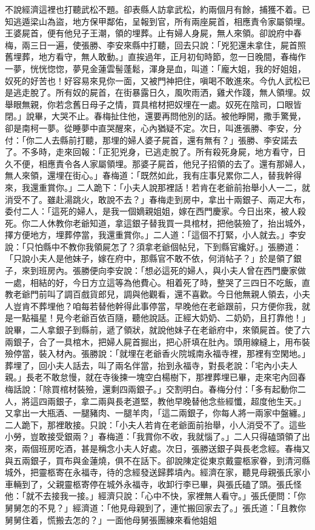 不說經濟這裡也打聽武松不題。卻表縣人訪拿武松，約兩個月有餘，捕獲不着。已知逃遁梁山為盜，地方保甲鄰佑，呈報到官，所有兩座屍首，相應責令家屬領埋。王婆屍首，便有他兒子王潮，領的埋葬。止有婦人身屍，無人來領。卻說府中春梅，兩三日一遍，使張勝、李安來縣中打聽，回去只說：「兇犯還未拿住，屍首照舊埋葬，地方看守，無人敢動。」直挨過年，正月初旬時節，忽一日晚間，春梅作一夢，恍恍惚惚，夢見金蓮雲髻蓬鬆，渾身是血，叫道：「龐大姐，我的好姐姐，奴死的好苦也！好容易來見你一面，又被門神把住，嗔喝不敢進來。今仇人武松已是逃走脫了。所有奴的屍首，在街暴露日久，風吹雨洒，雞犬作踐，無人領埋。奴舉眼無親，你若念舊日母子之情，買具棺材把奴埋在一處。奴死在陰司，口眼皆閉。」說畢，大哭不止。春梅扯住他，還要再問他別的話。被他睜開，撒手驚覺，卻是南柯一夢。從睡夢中直哭醒來，心內猶疑不定。次日，叫進張勝、李安，分付：「你二人去縣前打聽，那埋的婦人婆子屍首，還有無有？」張勝、李安諾去了。不多時，走來回報：「正犯兇身，已逃走脫了。所有殺死身屍，地方看守，日久不便，相應責令各人家屬領埋。那婆子屍首，他兒子招領的去了。還有那婦人，無人來領，還埋在街心。」春梅道：「既然如此，我有庄事兒累你二人，替我幹得來，我還重賞你。」二人跪下：「小夫人說那裡話！若肯在老爺前抬舉小人一二，就消受不了。雖赴湯跳火，敢說不去？」春梅走到房中，拿出十兩銀子、兩疋大布，委付二人：「這死的婦人，是我一個嫡親姐姐，嫁在西門慶家。今日出來，被人殺死。你二人休教你老爺知道，拿這銀子替我買一具棺材，把他裝殮了，抬出城外，擇方便地方，埋葬停當，我還重賞你。」二人道：「這個不打緊，小人就去。」李安說：「只怕縣中不教你我領屍怎了？須拿老爺個帖兒，下到縣官纔好。」張勝道：「只說小夫人是他妹子，嫁在府中，那縣官不敢不依，何消帖子？」於是領了銀子，來到班房內。張勝便向李安說：「想必這死的婦人，與小夫人曾在西門慶家做一處，相結的好，今日方立這等為他費心。相着死了時，整哭了三四日不吃飯，直教老爺門前叫了調百戲貨郎兒，調與他觀看，還不喜歡。今日他無親人領去，小夫人豈肯不葬埋他？咱每若替他幹得此事停當，早晚他在老爺跟前，只方便你我，就是一點福星！見今老爺百依百隨，聽他說話。正經大奶奶、二奶奶，且打靠他！」說畢，二人拿銀子到縣前，遞了領狀，就說他妹子在老爺府中，來領屍首。使了六兩銀子，合了一具棺木，把婦人屍首掘出，把心肝填在肚內。頭用線縫上，用布裝殮停當，裝入材內。張勝說：「就埋在老爺香火院城南永福寺裡，那裡有空閑地。」葬埋了，回小夫人話去，叫了兩名伴當，抬到永福寺，對長老說：「宅內小夫人親。」長老不敢怠慢，就在寺後揀一塊空白楊樹下，那裡葬埋已畢，走來宅內回春梅話說：「除買棺材裝殮，還剩四兩銀子。」交割明白。春梅分付：「多有起動你二人，將這四兩銀子，拿二兩與長老道堅，教他早晚替他念些經懺，超度他生天。」又拿出一大瓶酒、一腿豬肉、一腿羊肉，「這二兩銀子，你每人將一兩家中盤纏。」二人跪下，那裡敢接。只說：「小夫人若肯在老爺面前抬舉，小人消受不了。這些小勞，豈敢接受銀兩？」春梅道：「我賞你不收，我就惱了。」二人只得磕頭領了出來，兩個班房吃酒，甚是稱念小夫人好處。次日，張勝送銀子與長老念經。春梅又與五兩銀子，買布與金蓮燒，俱不在話下。卻說陳定從東京戴靈柩家眷，到清河縣城外，把靈柩寄在永福寺，待的念經發送歸葬墳內。經濟在家，聽見母親張氏家小車輛到了，父親靈柩寄停在城外永福寺，收卸行李已畢，與張氏磕了頭。張氏怪他：「就不去接我一接。」經濟只說：「心中不快，家裡無人看守。」張氏便問：「你舅舅怎的不見？」經濟道：「他見母親到了，連忙搬回家去了。」張氏道：「且教你舅舅住着，慌搬去怎的？」一面他母舅張團練來看他姐姐